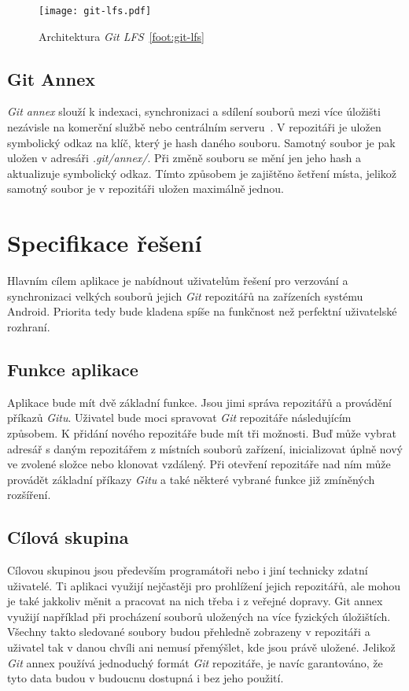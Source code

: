 \begin{figure}[h!]
    \begin{minipage}{\textwidth}
    \centering
    \vspace{0.5cm}
    \texttt{[image: git-lfs.pdf]}
    \caption{Architektura \emph{Git LFS}~\ref{foot:git-lfs}}
    \label{diagram:git-lfs}
    \end{minipage}
\end{figure}

\section{Git Annex}
\emph{Git annex} slouží k indexaci, synchronizaci a sdílení souborů mezi více úložišti nezávisle na komerční službě nebo centrálním serveru~\cite{wiki-git-annex}. V repozitáři je uložen symbolický odkaz na klíč, který je hash daného souboru. Samotný soubor je pak uložen v adresáři \emph{.git/annex/}. Při změně souboru se mění jen jeho hash a aktualizuje symbolický odkaz. Tímto způsobem je zajištěno šetření místa, jelikož samotný soubor je v repozitáři uložen maximálně jednou.

\chapter{Specifikace řešení}
Hlavním cílem aplikace je nabídnout uživatelům řešení pro verzování a synchronizaci velkých souborů jejich \emph{Git} repozitářů na zařízeních systému Android. Priorita tedy bude kladena spíše na funkčnost než perfektní uživatelské rozhraní.

\section{Funkce aplikace}
Aplikace bude mít dvě základní funkce. Jsou jimi správa repozitářů a provádění příkazů \emph{Gitu}. Uživatel bude moci spravovat \emph{Git} repozitáře následujícím způsobem. K přidání nového repozitáře bude mít tři možnosti. Buď může vybrat adresář s daným repozitářem z místních souborů zařízení, inicializovat úplně nový ve zvolené složce nebo klonovat vzdálený. Při otevření repozitáře nad ním může provádět základní příkazy \emph{Gitu} a také některé vybrané funkce již zmíněných rozšíření.

\section{Cílová skupina}
Cílovou skupinou jsou především programátoři nebo i jiní technicky zdatní uživatelé. Ti aplikaci využijí nejčastěji pro prohlížení jejich repozitářů, ale mohou je také jakkoliv měnit a pracovat na nich třeba i z veřejné dopravy. Git annex využijí například při procházení souborů uložených na více fyzických úložištích. Všechny takto sledované soubory budou přehledně zobrazeny v repozitáři a uživatel tak v danou chvíli ani nemusí přemýšlet, kde jsou právě uložené. Jelikož \emph{Git} annex používá jednoduchý formát \emph{Git} repozitáře, je navíc garantováno, že tyto data budou v budoucnu dostupná i bez jeho použití.


